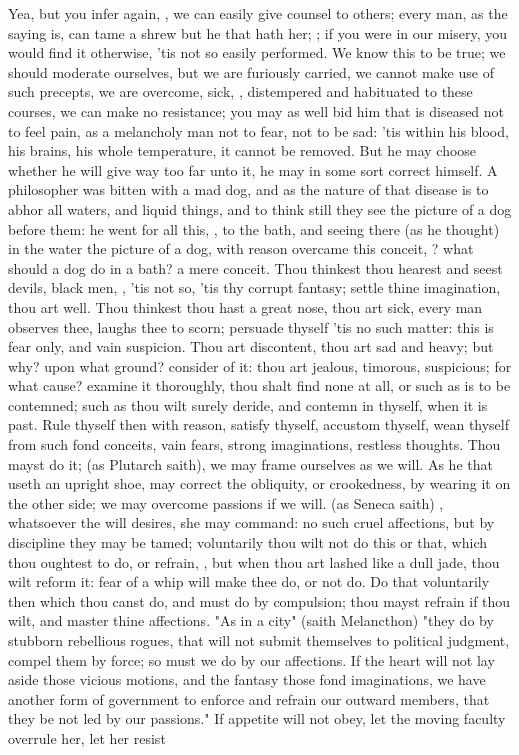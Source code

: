 {Yea, but you infer again, , we can easily give counsel to others; every man, as the saying is, can tame a shrew but he that hath her; ; if you were in our misery, you would find it otherwise, 'tis not so easily performed. We know this to be true; we should moderate ourselves, but we are furiously carried, we cannot make use of such precepts, we are overcome, sick, , distempered and habituated to these courses, we can make no resistance; you may as well bid him that is diseased not to feel pain, as a melancholy man not to fear, not to be sad: 'tis within his blood, his brains, his whole temperature, it cannot be removed. But he may choose whether he will give way too far unto it, he may in some sort correct himself. A philosopher was bitten with a mad dog, and as the nature of that disease is to abhor all waters, and liquid things, and to think still they see the picture of a dog before them: he went for all this, , to the bath, and seeing there (as he thought) in the water the picture of a dog, with reason overcame this conceit, ? what should a dog do in a bath? a mere conceit. Thou thinkest thou hearest and seest devils, black men, \etc{}, 'tis not so, 'tis thy corrupt fantasy; settle thine imagination, thou art well. Thou thinkest thou hast a great nose, thou art sick, every man observes thee, laughs thee to scorn; persuade thyself 'tis no such matter: this is fear only, and vain suspicion. Thou art discontent, thou art sad and heavy; but why? upon what ground? consider of it: thou art jealous, timorous, suspicious; for what cause? examine it thoroughly, thou shalt find none at all, or such as is to be contemned; such as thou wilt surely deride, and contemn in thyself, when it is past. Rule thyself then with reason, satisfy thyself, accustom thyself, wean thyself from such fond conceits, vain fears, strong imaginations, restless thoughts. Thou mayst do it;  (as Plutarch saith), we may frame ourselves as we will. As he that useth an upright shoe, may correct the obliquity, or crookedness, by wearing it on the other side; we may overcome passions if we will.  (as Seneca saith) , whatsoever the will desires, she may command: no such cruel affections, but by discipline they may be tamed; voluntarily thou wilt not do this or that, which thou oughtest to do, or refrain, \etc{}, but when thou art lashed like a dull jade, thou wilt reform it: fear of a whip will make thee do, or not do. Do that voluntarily then which thou canst do, and must do by compulsion; thou mayst refrain if thou wilt, and master thine affections. "As in a city" (saith Melancthon) "they do by stubborn rebellious rogues, that will not submit themselves to political judgment, compel them by force; so must we do by our affections. If the heart will not lay aside those vicious motions, and the fantasy those fond imaginations, we have another form of government to enforce and refrain our outward members, that they be not led by our passions." If appetite will not obey, let the moving faculty overrule her, let her resist }
